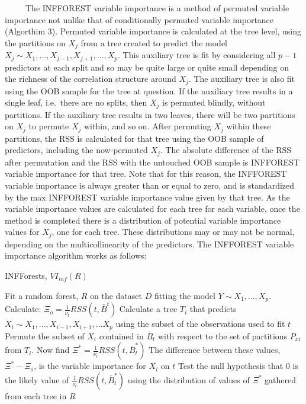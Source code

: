 \documentclass[12pt,twoside]{reedthesis}
\begin{document}
  ~~~~~The INFFOREST variable importance is a method of permuted variable
  importance not unlike that of conditionally permuted variable importance
  (Algorthim 3). Permuted variable importance is calculated at the tree
  level, using the partitions on \(X_j\) from a tree created to predict
  the model \(X_j \sim X_1,..., X_{j-1}, X_{j+1},...,X_p\). This auxiliary
  tree is fit by considering all \(p-1\) predictors at each split and so
  may be quite large or quite small depending on the richness of the
  correlation structure around \(X_j\). The auxiliary tree is also fit
  using the OOB sample for the tree at question. If the auxiliary tree
  results in a single leaf, i.e.~there are no splits, then \(X_j\) is
  permuted blindly, without partitions. If the auxiliary tree results in
  two leaves, there will be two partitions on \(X_j\) to permute \(X_j\)
  within, and so on. After permuting \(X_j\) within these partitions, the
  RSS is calculated for that tree using the OOB sample of predictors,
  including the now-permuted \(X_j\). The absolute difference of the RSS
  after permutation and the RSS with the untouched OOB sample is INFFOREST
  variable importance for that tree. Note that for this reason, the
  INFFOREST variable importance is always greater than or equal to zero,
  and is standardized by the max INFFOREST variable importance value given
  by that tree. As the variable importance values are calculated for each
  tree for each variable, once the method is completed there is a
  distribution of potential variable importance values for \(X_j\), one
  for each tree. These distributions may or may not be normal, depending
  on the multicollinearity of the predictors. The INFFOREST variable
  importance algorithm works as follows:
  
  \begin{algorithm}
  \caption{INFForests, $VI_{inf}(R)$}
  \label{infforest}
  \begin{algorithmic}[1]
  \State Fit a random forest, $R$ on the dataset $D$ fitting the model $Y \sim X_1,...,X_p$.
  \State Calculate: $\Xi_o =  \frac 1 {\nu_t} RSS(t,\bar{B}^t)$
  \State Calculate a tree $T_i$ that predicts $X_i \sim X_1,...,X_{i-1}, X_{i+1},...X_p$ using the subset of the observations used to fit $t$  
  \State Permute the subset of $X_i$ contained in $\bar{B}_t$ with respect to the set of partitions $P_{xi}$ from $T_i$.
  \State Now find $\Xi^* =  \frac 1 {\nu_t} RSS(t,\bar{B}_t^*)$
  \State The difference between these values, $\Xi^* - \Xi_o$,  is the variable importance for $X_i$ on $t$
  \EndFor
  \State Test the null hypothesis that $0$ is the likely value of $\frac 1 {\nu_t} RSS(t,\bar{B}_t^*)$ using the distribution of values of $\Xi^*$ gathered from each tree in $R$
  \EndFor
  \end{algorithmic}
  \end{algorithm}
  
\end{document}
